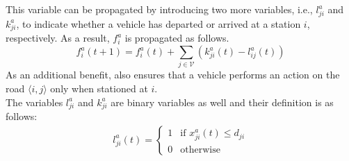 This variable can be propagated by introducing two more variables, i.e., $l^a_{ji}$ and $k^a_{ji}$, to indicate whether a vehicle has departed or arrived at a station $i$, respectively. As a result, $f^a_i$ is propagated as follows.
\begin{equation}
		f^a_i(t+1) =f^a_i(t) + \sum_{j\in\mathcal{V}}(k^a_{ji}(t) - l_{ij}^a(t)) 
		\label{eq:stationed_propagation_ind}
\end{equation}
As an additional benefit,  also ensures that a vehicle performs an action on the road $\langle i,j\rangle$ only when stationed at $i$.\\
The variables $l^a_{ji}$ and $k^a_{ji}$ are binary variables as well and their definition is as follows:
\begin{align}
	l^a_{ji}(t) =\begin{cases}
		1 & \text{if }x^a_{ji}(t) \le d_{ji}\\
		0 & \text{otherwise}
	\end{cases}
	\label{eq:departed_variable}
\end{align}


